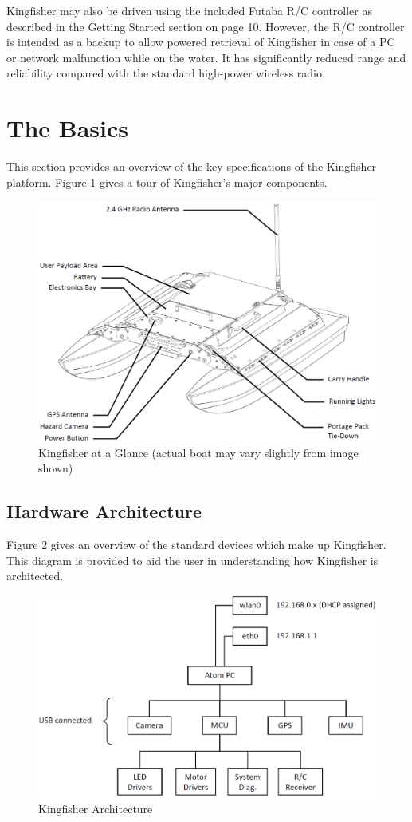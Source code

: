 \documentclass[]{clearpath-latex/clearpath-manual}
\begin{document}
Kingfisher may also be driven using the included Futaba R/C controller as described in the Getting Started section on page 10. However, the R/C controller is intended as a backup to allow powered retrieval of Kingfisher in case of a PC or network malfunction while on the water. It has significantly reduced range and reliability compared with the standard high-power wireless radio.

\section{The Basics}
This section provides an overview of the key specifications of the Kingfisher platform. Figure 1 gives a tour of Kingfisher's major components.

\begin{figure}[h]
  \centering
  \includegraphics[width=0.75\linewidth]{kf_schematic.PNG}
  \caption{Kingfisher at a Glance (actual boat may vary slightly from image shown)}
  \label{kf_the_basics}
\end{figure}
\newpage

\subsection{Hardware Architecture}
Figure 2 gives an overview of the standard devices which make up Kingfisher. This diagram is provided to aid the user in understanding how Kingfisher is architected.

\begin{figure}[h]
  \centering
  \includegraphics[width=0.75\linewidth]{kf_architecture.PNG}
  \caption{Kingfisher Architecture}
  \label{kf_architechure}
\end{figure}
\newpage
\end{document}
